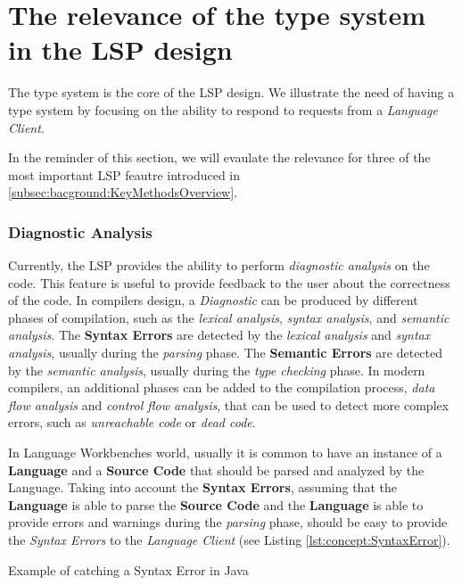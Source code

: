 \section{The relevance of the type system in the LSP design}\label{sec:concept:RelevanceOfTheTypeSystem}

The type system is the core of the LSP design. We illustrate the need of having a type system by focusing on the ability to respond to requests from a \textit{Language Client}.

In the reminder of this section, we will evaulate the relevance for three of the most important LSP feautre introduced in \ref{subsec:bacground:KeyMethodsOverview}.

\subsubsection{Diagnostic Analysis}\label{subsubsec:concept:DiagnosticAnalysis}

Currently, the LSP provides the ability to perform \textit{diagnostic analysis} on the code. This feature is useful to provide feedback to the user about the correctness of the code.
In compilers design, a \textit{Diagnostic} can be produced by different phases of compilation, such as the \textit{lexical analysis}, \textit{syntax analysis}, and \textit{semantic analysis}.
The \textbf{Syntax Errors} are detected by the \textit{lexical analysis} and \textit{syntax analysis}, usually during the \textit{parsing} phase. The \textbf{Semantic Errors} are detected by the \textit{semantic analysis}, usually during the \textit{type checking} phase.
In modern compilers, an additional phases can be added to the compilation process, \textit{data flow analysis} and \textit{control flow analysis}, that can be used to detect more complex errors, such as \textit{unreachable code} or \textit{dead code}.

In Language Workbenches world, usually it is common to have an instance of a \textbf{Language} and a \textbf{Source Code} that should be parsed and analyzed by the Language.
Taking into account the \textbf{Syntax Errors}, assuming that the \textbf{Language} is able to parse the \textbf{Source Code} and the \textbf{Language} is able to provide errors and warnings during the \textit{parsing} phase, should be easy to provide the \textit{Syntax Errors} to the \textit{Language Client} (see Listing \ref{lst:concept:SyntaxError}).

\begin{Listing}[t]
    \centering
    \caption{Example of catching a Syntax Error in Java}
    \label{lst:concept:SyntaxError}
\end{Listing}

